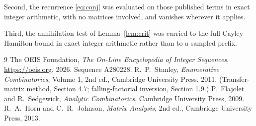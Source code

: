 \documentclass[11pt,a4paper]{article}
\theoremstyle{plain}
\theoremstyle{definition}
\begin{document}
Second, the recurrence \eqref{eq:conj} was evaluated on those published terms in exact
integer arithmetic, with no matrices involved, and vanishes wherever it applies.

Third, the annihilation test of Lemma~\ref{lem:crit} was carried to the full
Cayley--Hamilton bound in exact integer arithmetic rather than to a sampled prefix.

\begin{thebibliography}{9}
 The OEIS Foundation, \emph{The On-Line Encyclopedia of Integer
Sequences}, \url{https://oeis.org}, 2026. Sequence A280228.
 R.~P.~Stanley, \emph{Enumerative Combinatorics}, Volume 1, 2nd ed.,
Cambridge University Press, 2011. (Transfer-matrix method, Section 4.7; falling-factorial
inversion, Section 1.9.)
 P.~Flajolet and R.~Sedgewick, \emph{Analytic Combinatorics}, Cambridge
University Press, 2009.
 R.~A.~Horn and C.~R.~Johnson, \emph{Matrix Analysis}, 2nd ed., Cambridge
University Press, 2013.
\end{thebibliography}
\end{document}
